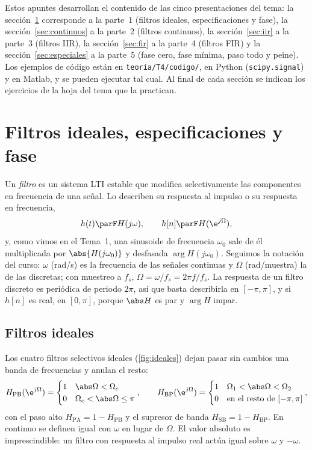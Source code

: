\documentclass[11pt,a4paper]{scrartcl}
\begin{document}

\begin{nota}
  Estos apuntes desarrollan el contenido de las cinco presentaciones del tema: la sección~\ref{sec:intro} corresponde a la parte~1 (filtros ideales, especificaciones y fase), la sección~\ref{sec:continuos} a la parte~2 (filtros continuos), la sección~\ref{sec:iir} a la parte~3 (filtros IIR), la sección~\ref{sec:fir} a la parte~4 (filtros FIR) y la sección~\ref{sec:especiales} a la parte~5 (fase cero, fase mínima, paso todo y peine). Los ejemplos de código están en \texttt{teoría/T4/codigo/}, en Python (\texttt{scipy.signal}) y en Matlab, y se pueden ejecutar tal cual. Al final de cada sección se indican los ejercicios de la hoja del tema que la practican.
\end{nota}

\tableofcontents

\section{Filtros ideales, especificaciones y fase}\label{sec:intro}

Un \emph{filtro} es un sistema LTI estable que modifica selectivamente las componentes en frecuencia de una señal. Lo describen su respuesta al impulso o su respuesta en frecuencia,
\[
  h(t)\parF H(j\omega),\qquad h[n]\parF H(\e^{j\Omega}),
\]
y, como vimos en el Tema~1, una sinusoide de frecuencia $\omega_0$ sale de él multiplicada por $\abs{H(j\omega_0)}$ y desfasada $\arg H(j\omega_0)$. Seguimos la notación del curso: $\omega$ (rad/s) es la frecuencia de las señales continuas y $\Omega$ (rad/muestra) la de las discretas; con muestreo a $f_s$, $\Omega=\omega/f_s=2\pi f/f_s$. La respuesta de un filtro discreto es periódica de periodo $2\pi$, así que basta describirla en $[-\pi,\pi]$, y si $h[n]$ es real, en $[0,\pi]$, porque $\abs H$ es par y $\arg H$ impar.

\subsection{Filtros ideales}

Los cuatro filtros selectivos ideales (\cref{fig:ideales}) dejan pasar sin cambios una banda de frecuencias y anulan el resto:
\[
  H_{\text{PB}}(\e^{j\Omega})=\begin{cases}1&\abs\Omega<\Omega_c\\0&\Omega_c<\abs\Omega\le\pi\end{cases},\qquad
  H_{\text{BP}}(\e^{j\Omega})=\begin{cases}1&\Omega_1<\abs\Omega<\Omega_2\\0&\text{en el resto de }[-\pi,\pi]\end{cases},
\]
con el paso alto $H_{\text{PA}}=1-H_{\text{PB}}$ y el supresor de banda $H_{\text{SB}}=1-H_{\text{BP}}$. En continuo se definen igual con $\omega$ en lugar de $\Omega$. El valor absoluto es imprescindible: un filtro con respuesta al impulso real actúa igual sobre $\omega$ y $-\omega$.
\end{document}
